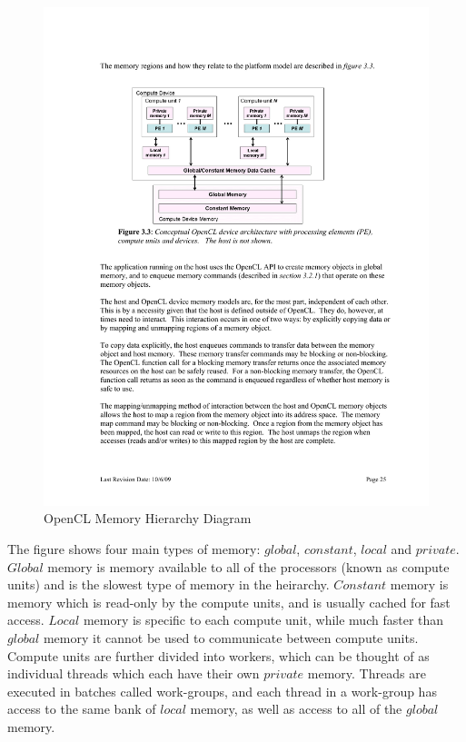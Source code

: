 \begin{figure}[!htc]
 		\centering
		\includegraphics[scale=1.0]{figures/gpu_memory.pdf}
        \caption{ OpenCL Memory Hierarchy Diagram \cite{OpenCLSpec} }
        \label{fig:gpu_memory}
\end{figure}

The figure shows four main types of memory: $global$, $constant$, $local$ and
$private$. $Global$ memory is memory available to all of the processors (known
as compute units) and is the slowest type of memory in the heirarchy.
$Constant$ memory is memory which is read-only by the compute units, and is
usually cached for fast access. $Local$ memory is specific to each compute
unit, while much faster than $global$ memory it cannot be used to communicate
between compute units. Compute units are further divided into workers, which
can be thought of as individual threads which each have their own $private$
memory. Threads are executed in batches called work-groups, and each thread in a
work-group has access to the same bank of $local$ memory, as well as access to
all of the $global$ memory. 


